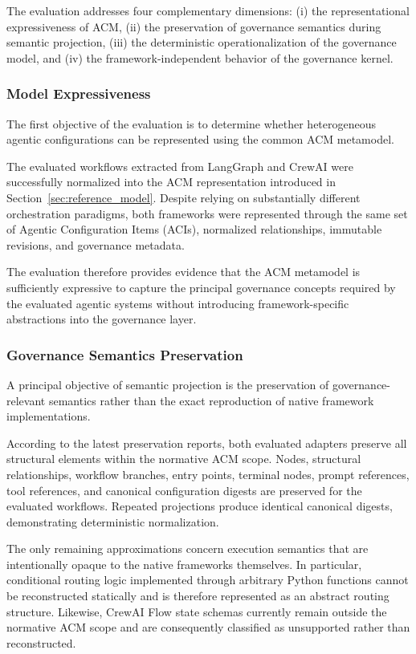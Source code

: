 \documentclass[10pt]{article}
\begin{document}
The evaluation addresses four complementary dimensions: (i) the representational expressiveness of ACM, (ii) the preservation of governance semantics during semantic projection, (iii) the deterministic operationalization of the governance model, and (iv) the framework-independent behavior of the governance kernel.

\subsubsection{Model Expressiveness}

The first objective of the evaluation is to determine whether heterogeneous agentic configurations can be represented using the common ACM metamodel.

The evaluated workflows extracted from LangGraph and CrewAI were successfully normalized into the ACM representation introduced in Section~\ref{sec:reference_model}. Despite relying on substantially different orchestration paradigms, both frameworks were represented through the same set of Agentic Configuration Items (ACIs), normalized relationships, immutable revisions, and governance metadata.

The evaluation therefore provides evidence that the ACM metamodel is sufficiently expressive to capture the principal governance concepts required by the evaluated agentic systems without introducing framework-specific abstractions into the governance layer.

\subsubsection{Governance Semantics Preservation}

A principal objective of semantic projection is the preservation of governance-relevant semantics rather than the exact reproduction of native framework implementations.

According to the latest preservation reports, both evaluated adapters preserve all structural elements within the normative ACM scope. Nodes, structural relationships, workflow branches, entry points, terminal nodes, prompt references, tool references, and canonical configuration digests are preserved for the evaluated workflows. Repeated projections produce identical canonical digests, demonstrating deterministic normalization.

The only remaining approximations concern execution semantics that are intentionally opaque to the native frameworks themselves. In particular, conditional routing logic implemented through arbitrary Python functions cannot be reconstructed statically and is therefore represented as an abstract routing structure. Likewise, CrewAI Flow state schemas currently remain outside the normative ACM scope and are consequently classified as unsupported rather than reconstructed.
\end{document}
